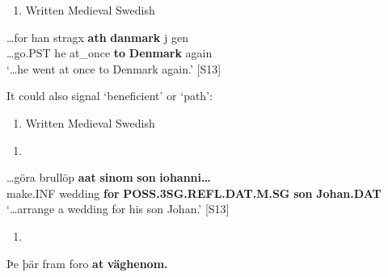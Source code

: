 \begin{enumerate} %
\item 
Written Medieval Swedish

\end{enumerate} %
\ea\label{}
\gll …for  han  stragx  \textbf{ath} \textbf{danmark} j gen\\


…go.PST  he  at\_once  \textbf{to} \textbf{Denmark} again\\ %


‘…he went at once to Denmark again.’ [S13]
\z

It could also signal ‘beneficient’ or ‘path’:


\begin{enumerate} %
\item 
Written Medieval Swedish

\end{enumerate} %
\setcounter{listLFOxcviiileveli}{0}
\begin{enumerate} %
\item 
\end{enumerate} %
\ea\label{}
\gll …göra  brullöp  \textbf{aat} \textbf{sinom} \textbf{son} \textbf{iohanni…}\\


make.INF  wedding  \textbf{for} \textbf{POSS.3SG.REFL.DAT.M.SG} \textbf{son} \textbf{Johan.DAT}\\ %


‘…arrange a wedding for his son Johan.’ [S13]
\z

\begin{enumerate} %
\item 
\end{enumerate} %
\ea\label{}
\gll Þe  þär  fram  foro  \textbf{at} \textbf{väghenom.}\\


